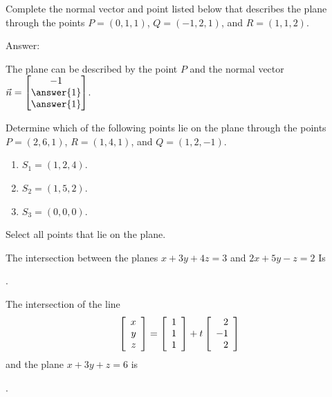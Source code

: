 \documentclass{ximera}
\author{Zack Reed}
\begin{document}
\begin{problem}
  Complete the normal vector and point listed below that describes the plane through the
  points $P = (0,1,1)$, $Q = (-1,2,1)$, and $R = (1,1,2)$.

  Answer:

  The plane can be described by the point $P$ and the normal vector $\vec{n}=\begin{bmatrix}
    -1\\
    \answer{1}\\
    \answer{1}
  \end{bmatrix}$.
\end{problem}

\begin{problem}
  Determine which of the following points lie on the plane through the
  points $P = (2,6,1)$, $R = (1,4,1)$, and $Q = (1,2,-1)$.
  \begin{enumerate}
  \item $S_1=(1,2,4)$.
  \item $S_2=(1,5,2)$.
  \item $S_3=(0,0,0)$.
  \end{enumerate}

  Select all points that lie on the plane.
  \begin{selectAll}
  \end{selectAll}
\end{problem}

\begin{problem}
  The intersection between the planes $x+3y+4z=3$ and $2x+5y-z=2$
  Is \begin{multipleChoice}
  \end{multipleChoice}.
\end{problem}

\begin{problem}
  The intersection of the line
  \begin{equation*}
    \startmat{r} x \\ y \\ z \stopmat
    = \startmat{r} 1 \\ 1 \\ 1 \stopmat
    + t \startmat{r} 2 \\ -1 \\ 2 \stopmat
  \end{equation*}
  and the plane $x+3y+z = 6$ is \begin{multipleChoice}
  \end{multipleChoice}.
\end{problem}
\end{document}
